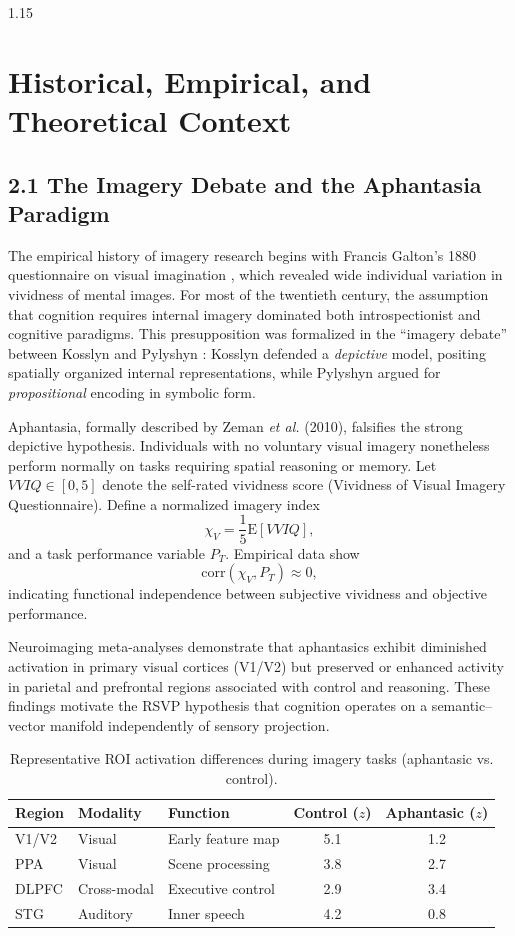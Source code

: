 \documentclass[12pt,a4paper]{article}
\begin{document}
\begin{spacing}{1.15}
\section{Historical, Empirical, and Theoretical Context}

\subsection{2.1 The Imagery Debate and the Aphantasia Paradigm}

The empirical history of imagery research begins with Francis Galton’s 1880 questionnaire on visual imagination \cite{galton1880}, which revealed wide individual variation in vividness of mental images.  
For most of the twentieth century, the assumption that cognition requires internal imagery dominated both introspectionist and cognitive paradigms.  
This presupposition was formalized in the “imagery debate” between Kosslyn and Pylyshyn \cite{kosslyn1980,pylyshyn1981}: Kosslyn defended a \emph{depictive} model, positing spatially organized internal representations, while Pylyshyn argued for \emph{propositional} encoding in symbolic form.

Aphantasia, formally described by Zeman \emph{et al.} (2010), falsifies the strong depictive hypothesis.  
Individuals with no voluntary visual imagery nonetheless perform normally on tasks requiring spatial reasoning or memory.  
Let \(VVIQ \in [0,5]\) denote the self-rated vividness score (Vividness of Visual Imagery Questionnaire).  
Define a normalized imagery index
\[
\chi_V = \frac{1}{5}\mathrm{E}[VVIQ],
\]
and a task performance variable \(P_T\).  
Empirical data show
\[
\mathrm{corr}(\chi_V, P_T) \approx 0,
\]
indicating functional independence between subjective vividness and objective performance.

Neuroimaging meta-analyses \cite{fulford2018, keogh2021} demonstrate that aphantasics exhibit diminished activation in primary visual cortices (V1/V2) but preserved or enhanced activity in parietal and prefrontal regions associated with control and reasoning.  
These findings motivate the RSVP hypothesis that cognition operates on a semantic–vector manifold independently of sensory projection.

\begin{table}[h!]
\centering
\caption{Representative ROI activation differences during imagery tasks (aphantasic vs. control).}
\begin{tabular}{@{}lllcc@{}}
\toprule
Region & Modality & Function & Control ($z$) & Aphantasic ($z$)\\
\midrule
V1/V2 & Visual & Early feature map & 5.1 & 1.2\\
PPA & Visual & Scene processing & 3.8 & 2.7\\
DLPFC & Cross-modal & Executive control & 2.9 & 3.4\\
STG & Auditory & Inner speech & 4.2 & 0.8\\
\bottomrule
\end{tabular}
\end{table}


\end{spacing}
\end{document}
